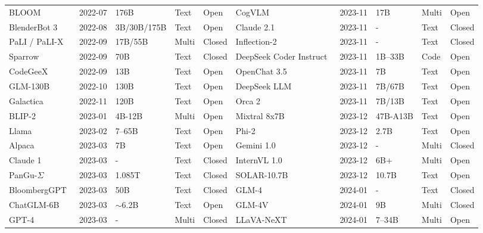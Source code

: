 \begin{table}[htbp]
{\begin{tabular}{@{} lllll | lllll @{}}
BLOOM~\cite{bigscience2022bloom} & 2022-07 & 176B & Text & Open & CogVLM~\cite{wang2023cogvlm} & 2023-11 & 17B & Multi & Open \\
BlenderBot 3~\cite{shuster2022blenderbot} & 2022-08 & 3B/30B/175B & Text & Open & Claude 2.1~\cite{anthropic2023claude21} & 2023-11 & - & Text & Closed \\
PaLI / PaLI-X~\cite{chen2022pali,chen2023palix} & 2022-09 & 17B/55B & Multi & Closed & Inflection-2~\cite{inflection2023inflection2} & 2023-11 & - & Text & Closed \\
Sparrow~\cite{glaese2022improving} & 2022-09 & 70B & Text & Closed & DeepSeek Coder Instruct~\cite{deepseekai2023deepseekcoder} & 2023-11 & 1B--33B & Code & Open \\
CodeGeeX~\cite{zheng2023codegeex} & 2022-09 & 13B & Text & Open & OpenChat 3.5~\cite{wang2024openchat} & 2023-11 & 7B & Text & Open \\
GLM-130B~\cite{zeng2022glm130b} & 2022-10 & 130B & Text & Open & DeepSeek LLM~\cite{bi2024deepseek} & 2023-11 & 7B/67B & Text & Open \\
Galactica~\cite{taylor2022galactica} & 2022-11 & 120B & Text & Open & Orca 2~\cite{mitra2023orca} & 2023-11 & 7B/13B & Text & Open \\
BLIP-2~\cite{li2023blip} & 2023-01 & 4B-12B & Multi & Open & Mixtral 8x7B~\cite{jiang2024mixtral} & 2023-12 & 47B-A13B & Text & Open \\
Llama~\cite{touvron2023llama} & 2023-02 & 7--65B & Text & Open & Phi-2~\cite{microsoft2023phi2} & 2023-12 & 2.7B & Text & Open \\
Alpaca~\cite{alpaca2023stanford} & 2023-03 & 7B & Text & Open & Gemini 1.0~\cite{gemini2023} & 2023-12 & - & Multi & Closed \\
Claude 1~\cite{anthropic2023claude,bai2022constitutional} & 2023-03 & - & Text & Closed & InternVL 1.0~\cite{chen2023internvl} & 2023-12 & 6B+ & Multi & Open \\
PanGu-$\Sigma$~\cite{ren2023pangu} & 2023-03 & 1.085T & Text & Closed & SOLAR-10.7B~\cite{kim2024solar} & 2023-12 & 10.7B & Text & Open \\
BloombergGPT~\cite{wu2023bloomberggpt} & 2023-03 & 50B & Text & Closed & GLM-4~\cite{zhipu2024glm4} & 2024-01 & - & Text & Closed \\
ChatGLM-6B~\cite{thudm2023chatglm6b} & 2023-03 & $\sim$6.2B & Text & Open & GLM-4V~\cite{zhipu2024glm4} & 2024-01 & 9B & Multi & Closed \\
GPT-4~\cite{achiam2023gpt} & 2023-03 & - & Multi & Closed & LLaVA-NeXT~\cite{liu2024llavanext} & 2024-01 & 7--34B & Multi & Open \\

\end{tabular}}
\end{table}
